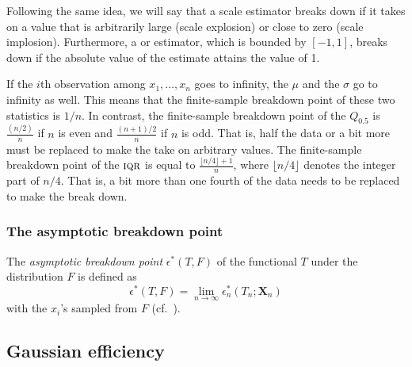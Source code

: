 Following the same idea, we will say that a scale estimator breaks down if it
takes on a value that is arbitrarily large (scale explosion) or close to zero
(scale implosion). Furthermore, a  or 
estimator, which is bounded by $[-1, 1]$, breaks down if the absolute value of
the estimate attains the value of 1.

\begin{stexample}
If the $i$th observation among $x_1, \dots, x_n$ goes to infinity, the 
$\mu$ and the  $\sigma$ go to infinity as well. This
means that the finite-sample breakdown point of these two statistics is $1/n$.
In contrast, the finite-sample breakdown point of the  $Q_{0.5}$ is
$\frac{(n/2)}{n}$ if $n$ is even and $\frac{(n+1)/2}{n}$ if $n$ is odd. That is,
half the data or a bit more must be replaced to make the  take on arbitrary
values. The finite-sample breakdown point of the 
$\stsc{IQR}$ is equal to $\frac{\lfloor n/4 \rfloor + 1}{n}$, where
$\lfloor n/4 \rfloor $ denotes the integer part of $n/4$. That is, a bit more than 
one fourth of the data needs to be replaced to make the  break down.
\end{stexample}



\subsubsection{The asymptotic breakdown point}

The \emph{asymptotic breakdown point} $\epsilon^*(T, F)$ of the functional
$T$ under the distribution $F$ is defined as
\[
    \epsilon^*(T, F) = \lim_{n\rightarrow\infty} \epsilon_n^*(T_n; \mathbf{X}_n)
\]
with the $x_i$'s sampled from $F$ (cf.\ \citealp{hampel:1971}).               


\subsection{Gaussian efficiency}

